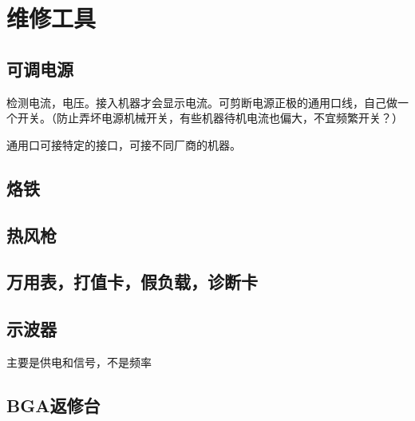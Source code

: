 \chapter{维修工具}
\section{可调电源}
检测电流，电压。接入机器才会显示电流。可剪断电源正极的通用口线，自己做一个开关。（防止弄坏电源机械开关，有些机器待机电流也偏大，不宜频繁开关？）

通用口可接特定的接口，可接不同厂商的机器。

\section{烙铁}

\section{热风枪}

\section{万用表，打值卡，假负载，诊断卡}

\section{示波器}
主要是供电和信号，不是频率

\section{BGA返修台}
